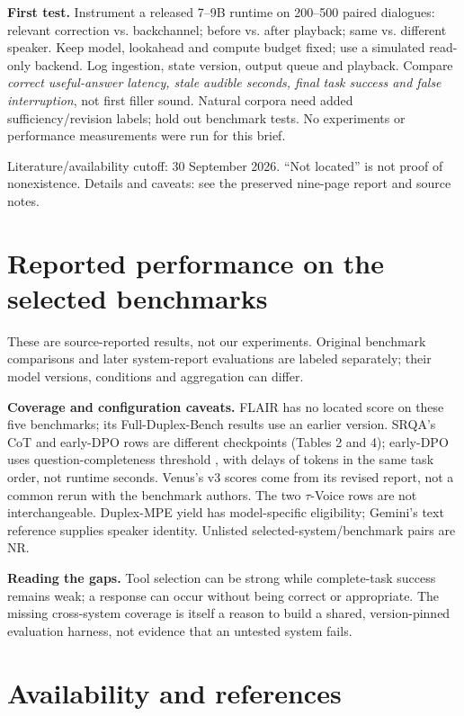 \documentclass{article}
\begin{document}
\textbf{First test.} Instrument a released 7--9B runtime on 200--500 paired dialogues: relevant correction vs. backchannel; before vs. after playback; same vs. different speaker. Keep model, lookahead and compute budget fixed; use a simulated read-only backend. Log ingestion, state version, output queue and playback. Compare \emph{correct useful-answer latency, stale audible seconds, final task success and false interruption}, not first filler sound. Natural corpora need added sufficiency/revision labels; hold out benchmark tests. No experiments or performance measurements were run for this brief.

{\small Literature/availability cutoff: 30 September 2026. “Not located” is not proof of nonexistence. Details and caveats: see the preserved nine-page report and source notes.}

\newpage
\label{page:performance}
\section{Reported performance on the selected benchmarks}
These are source-reported results, not our experiments. Original benchmark comparisons and later system-report evaluations are labeled separately; their model versions, conditions and aggregation can differ.



{\small\textbf{Coverage and configuration caveats.} FLAIR has no located score on these five benchmarks; its Full-Duplex-Bench results use an earlier version. SRQA's CoT and early-DPO rows are different checkpoints (Tables 2 and 4); early-DPO uses question-completeness threshold \srqaQCThreshold, with delays of \srqaDPODelays{} tokens in the same task order, not runtime seconds. Venus's v3 scores come from its revised report, not a common rerun with the benchmark authors. The two $\tau$-Voice rows are not interchangeable. Duplex-MPE yield has model-specific eligibility; Gemini's text reference supplies speaker identity. Unlisted selected-system/benchmark pairs are NR.}

\smallskip
\textbf{Reading the gaps.} Tool selection can be strong while complete-task success remains weak; a response can occur without being correct or appropriate. The missing cross-system coverage is itself a reason to build a shared, version-pinned evaluation harness, not evidence that an untested system fails.

\newpage
\label{page:references}
\section*{Availability and references}

\begingroup
\footnotesize
\setlength{\parskip}{2pt}

\endgroup
\end{document}

